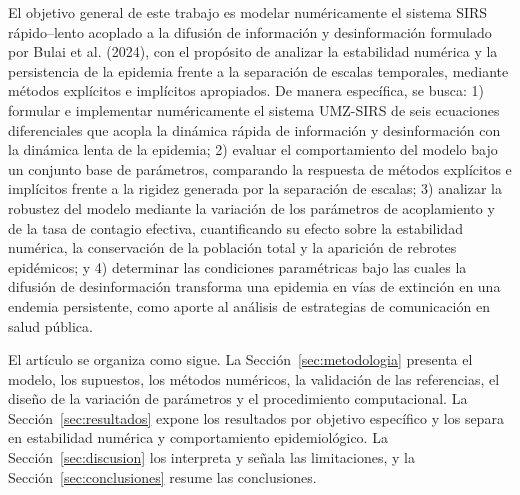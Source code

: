 El objetivo general de este trabajo es modelar numéricamente el sistema SIRS rápido--lento acoplado a la difusión de información y desinformación formulado por Bulai et al. (2024), con el propósito de analizar la estabilidad numérica y la persistencia de la epidemia frente a la separación de escalas temporales, mediante métodos explícitos e implícitos apropiados. De manera específica, se busca: 1) formular e implementar numéricamente el sistema UMZ-SIRS de seis ecuaciones diferenciales que acopla la dinámica rápida de información y desinformación con la dinámica lenta de la epidemia; 2) evaluar el comportamiento del modelo bajo un conjunto base de parámetros, comparando la respuesta de métodos explícitos e implícitos frente a la rigidez generada por la separación de escalas; 3) analizar la robustez del modelo mediante la variación de los parámetros de acoplamiento y de la tasa de contagio efectiva, cuantificando su efecto sobre la estabilidad numérica, la conservación de la población total y la aparición de rebrotes epidémicos; y 4) determinar las condiciones paramétricas bajo las cuales la difusión de desinformación transforma una epidemia en vías de extinción en una endemia persistente, como aporte al análisis de estrategias de comunicación en salud pública.

El artículo se organiza como sigue. La Sección~\ref{sec:metodologia} presenta el modelo, los supuestos, los métodos numéricos, la validación de las referencias, el diseño de la variación de parámetros y el procedimiento computacional. La Sección~\ref{sec:resultados} expone los resultados por objetivo específico y los separa en estabilidad numérica y comportamiento epidemiológico. La Sección~\ref{sec:discusion} los interpreta y señala las limitaciones, y la Sección~\ref{sec:conclusiones} resume las conclusiones.

